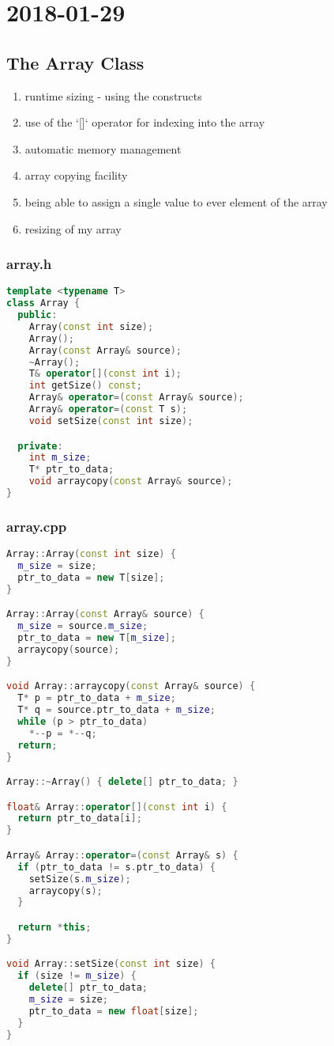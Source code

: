 \section{2018-01-29}

\subsection{The Array Class}

\begin{enumerate}
  \item runtime sizing - using the constructs
  \item use of the `[]` operator for indexing into the array
  \item automatic memory management
  \item array copying facility
  \item being able to assign a single value to ever element of the array
  \item resizing of my array
\end{enumerate}

\subsubsection{array.h}

\begin{lstlisting}[language=C++]
template <typename T>
class Array {
  public:
    Array(const int size);
    Array();
    Array(const Array& source);
    ~Array();
    T& operator[](const int i);
    int getSize() const;
    Array& operator=(const Array& source);
    Array& operator=(const T s);
    void setSize(const int size);

  private:
    int m_size;
    T* ptr_to_data;
    void arraycopy(const Array& source);
}
\end{lstlisting}

\subsubsection{array.cpp}

\begin{lstlisting}[language=C++]
Array::Array(const int size) {
  m_size = size;
  ptr_to_data = new T[size];
}

Array::Array(const Array& source) {
  m_size = source.m_size;
  ptr_to_data = new T[m_size];
  arraycopy(source);
}

void Array::arraycopy(const Array& source) {
  T* p = ptr_to_data + m_size;
  T* q = source.ptr_to_data + m_size;
  while (p > ptr_to_data)
    *--p = *--q;
  return;
}

Array::~Array() { delete[] ptr_to_data; }

float& Array::operator[](const int i) {
  return ptr_to_data[i];
}

Array& Array::operator=(const Array& s) {
  if (ptr_to_data != s.ptr_to_data) {
    setSize(s.m_size);
    arraycopy(s);
  }

  return *this;
}

void Array::setSize(const int size) {
  if (size != m_size) {
    delete[] ptr_to_data;
    m_size = size;
    ptr_to_data = new float[size];
  }
}
\end{lstlisting}
